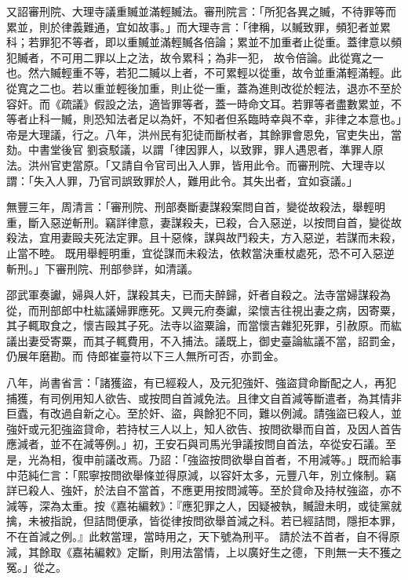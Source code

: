 \begin{pinyinscope}
 又詔審刑院、大理寺議重贓並滿輕贓法。審刑院言：「所犯各異之贓，不待罪等而累並，則於律義難通，宜如故事。」而大理寺言：「律稱，以贓致罪，頻犯者並累科；若罪犯不等者，即以重贓並滿輕贓各倍論；累並不加重者止從重。蓋律意以頻犯贓者，不可用二罪以上之法，故令累科；為非一犯，
 故令倍論。此從寬之一也。然六贓輕重不等，若犯二贓以上者，不可累輕以從重，故令並重滿輕滿輕。此從寬之二也。若以重並輕後加重，則止從一重，蓋為進則改從於輕法，退亦不至於容奸。而《疏議》假設之法，適皆罪等者，蓋一時命文耳。若罪等者盡數累並，不等者止科一贓，則恐知法者足以為奸，不知者但系臨時幸與不幸，非律之本意也。」帝是大理議，行之。八年，洪州民有犯徒而斷杖者，其餘罪會恩免，官吏失出，當劾。中書堂後官
 劉袞駁議，以謂「律因罪人，以致罪，罪人遇恩者，準罪人原法。洪州官吏當原。「又請自令官司出入人罪，皆用此令。而審刑院、大理寺以謂：「失入人罪，乃官司誤致罪於人，難用此令。其失出者，宜如袞議。」



 無豐三年，周清言：「審刑院、刑部奏斷妻謀殺案問自首，變從故殺法，舉輕明重，斷入惡逆斬刑。竊詳律意，妻謀殺夫，已殺，合入惡逆，以按問自首，變從故殺法，宜用妻毆夫死法定罪。且十惡條，謀與故鬥殺夫，方入惡逆，若謀而未殺，止當不睦。
 既用舉輕明重，宜從謀而未殺法，依敕當決重杖處死，恐不可入惡逆斬刑。」下審刑院、刑部參詳，如清議。



 邵武軍奏讞，婦與人奸，謀殺其夫，已而夫醉歸，奸者自殺之。法寺當婦謀殺為從，而刑部郎中杜紘議婦罪應死。又興元府奏讞，梁懷吉往視出妻之病，因寄粟，其子輒取食之，懷吉毆其子死。法寺以盜粟論，而當懷吉雜犯死罪，引赦原。而紘議出妻受寄粟，而其子輒費用，不入捕法。議既上，御史臺論紘議不當，詔罰金，仍展年磨勘。而
 侍郎崔臺符以下三人無所可否，亦罰金。



 八年，尚書省言：「諸獲盜，有已經殺人，及元犯強奸、強盜貸命斷配之人，再犯捕獲，有司例用知人欲告、或按問自首減免法。且律文自首減等斷遣者，為其情非巨蠹，有改過自新之心。至於奸、盜，與餘犯不同，難以例減。請強盜已殺人，並強奸或元犯強盜貸命，若持杖三人以上，知人欲告、按問欲舉而自首，及因人首告應減者，並不在減等例。」初，王安石與司馬光爭議按問自首法，卒從安石議。至
 是，光為相，復申前議改焉。乃詔：「強盜按問欲舉自首者，不用減等。」既而給事中范純仁言：「熙寧按問欲舉條並得原減，以容奸太多，元豐八年，別立條制。竊詳已殺人、強奸，於法自不當首，不應更用按問減等。至於貸命及持杖強盜，亦不減等，深為太重。按《嘉祐編敕》：『應犯罪之人，因疑被執，贓證未明，或徒黨就擒，未被指說，但詰問便承，皆從律按問欲舉首減之科。若已經詰問，隱拒本罪，不在首減之例。』此敕當理，當時用之，天下號為刑平。
 請於法不首者，自不得原減，其餘取《嘉祐編敕》定斷，則用法當情，上以廣好生之德，下則無一夫不獲之冤。」從之。




\end{pinyinscope}

